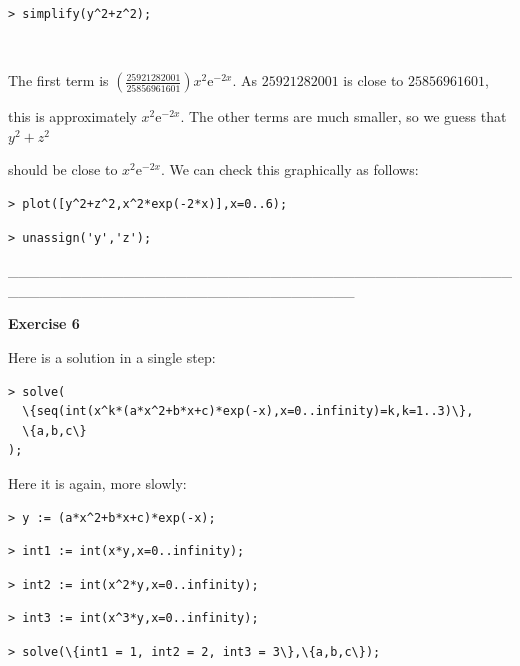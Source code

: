 \documentclass{article}
\begin{document}
\begin{lstlisting}
> simplify(y^2+z^2);
\end{lstlisting}
\begin{Maple Normal}
\

The first term is 
$(\frac{25921282001}{25856961601}) x^{2} {\mathrm e}^{-2 x}$.  As 
$25921282001$ is close to 
$25856961601$, \

this is approximately 
$x^{2} {\mathrm e}^{-2 x}$.  The other terms are much smaller, so we guess that 
$y^{2}+z^{2}$\

should be close to 
$x^{2} {\mathrm e}^{-2 x}$.  We can check this graphically as follows:
\end{Maple Normal}
\begin{lstlisting}
> plot([y^2+z^2,x^2*exp(-2*x)],x=0..6);
\end{lstlisting}
\begin{lstlisting}
> unassign('y','z');
\end{lstlisting}
\begin{Maple Normal}
\_\_\_\_\_\_\_\_\_\_\_\_\_\_\_\_\_\_\_\_\_\_\_\_\_\_\_\_\_\_\_\_\_\_\_\_\_\_\_\_\_\_\_\_\_\_\_\_\_\_\_\_\_\_\_\_\_\_\_\_\_\_\_\_\_\_\_\_\_\_\_\_\_\_\_\_\_\_\_\_\_
\end{Maple Normal}
\begin{Maple Normal}
\textbf{Exercise 6}
\end{Maple Normal}
\begin{Maple Normal}
Here is a solution in a single step:
\end{Maple Normal}
\begin{lstlisting}
> solve(
  \{seq(int(x^k*(a*x^2+b*x+c)*exp(-x),x=0..infinity)=k,k=1..3)\},
  \{a,b,c\}
);
\end{lstlisting}
\begin{Maple Normal}
Here it is again, more slowly:
\end{Maple Normal}
\begin{lstlisting}
> y := (a*x^2+b*x+c)*exp(-x);
\end{lstlisting}
\begin{lstlisting}
> int1 := int(x*y,x=0..infinity);
\end{lstlisting}
\begin{lstlisting}
> int2 := int(x^2*y,x=0..infinity);
\end{lstlisting}
\begin{lstlisting}
> int3 := int(x^3*y,x=0..infinity);
\end{lstlisting}
\begin{lstlisting}
> solve(\{int1 = 1, int2 = 2, int3 = 3\},\{a,b,c\});
\end{lstlisting}
\end{document}
